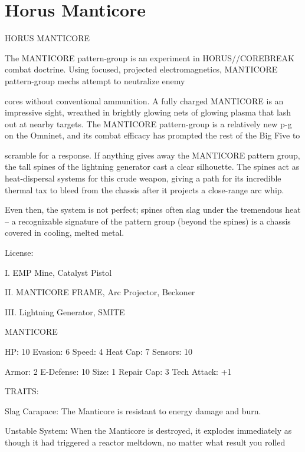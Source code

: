 \section{Horus Manticore}

                                        HORUS MANTICORE  

The MANTICORE pattern-group is an experiment in HORUS//COREBREAK combat doctrine. Using  
focused, projected electromagnetics, MANTICORE pattern-group mechs attempt to neutralize enemy  

cores without conventional ammunition. A fully charged MANTICORE is an impressive sight, wreathed in  
brightly glowing nets of glowing plasma that lash out at nearby targets. The MANTICORE pattern-group is  
a relatively new p-g on the Omninet, and its combat efficacy has prompted the rest of the Big Five to  

scramble for a response. If anything gives away the MANTICORE pattern group, the tall spines of the  
lightning generator cast a clear silhouette. The spines act as heat-dispersal systems for this crude weapon,  
giving a path for its incredible thermal tax to bleed from the chassis after it projects a close-range arc whip.  

Even then, the system is not perfect; spines often slag under the tremendous heat -- a recognizable  
signature of the pattern group (beyond the spines) is a chassis covered in cooling, melted metal.    

                                                    License:
 
I. EMP Mine, Catalyst Pistol
 
II. MANTICORE FRAME, Arc Projector, Beckoner
 
III. Lightning Generator, SMITE
 

                                                MANTICORE 

 HP: 10          Evasion: 6                            Speed: 4            Heat Cap: 7        Sensors: 10 

 Armor: 2        E-Defense: 10                         Size: 1             Repair Cap: 3      Tech Attack:   
                                                                                              +1 

                                                    TRAITS: 

 Slag Carapace: The Manticore is resistant to energy damage and burn.
 
 Unstable System: When the Manticore is destroyed, it explodes immediately as though it had triggered  
 a reactor meltdown, no matter what result you rolled 

